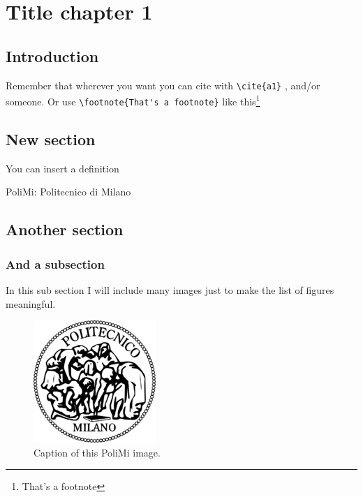 \chapter{Title chapter 1}

\section{Introduction}\label{sec:i}
Remember that wherever you want you can cite with \verb.\cite{a1}. \cite{a1}, \cite{b1} and/or \cite{m1} someone.
Or use \verb.\footnote{That's a footnote}. like this\footnote{That's a footnote} 


\section{New section}
You can insert a definition
	\begin{Definition}
		PoliMi: Politecnico di Milano
	\end{Definition}
	
\section{Another section}
	\subsection{And a subsection}
		In this sub section I will include many images just to make the list of figures meaningful.

			\begin{figure}[h!tb]
				\centerline {\includegraphics[scale=0.6]{img/logopoli.png}}
				\caption{Caption of this PoliMi image.}
				\label{fig:leet}
			\end{figure}

